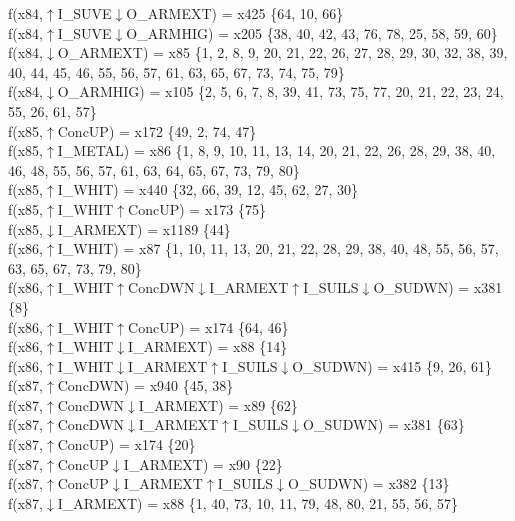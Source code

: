 f(x84,$\uparrow$I\_SUVE$\downarrow$O\_ARMEXT) = x425 \{64, 10, 66\} \\  
f(x84,$\uparrow$I\_SUVE$\downarrow$O\_ARMHIG) = x205 \{38, 40, 42, 43, 76, 78, 25, 58, 59, 60\} \\  
f(x84,$\downarrow$O\_ARMEXT) = x85 \{1, 2, 8, 9, 20, 21, 22, 26, 27, 28, 29, 30, 32, 38, 39, 40, 44, 45, 46, 55, 56, 57, 61, 63, 65, 67, 73, 74, 75, 79\} \\  
f(x84,$\downarrow$O\_ARMHIG) = x105 \{2, 5, 6, 7, 8, 39, 41, 73, 75, 77, 20, 21, 22, 23, 24, 55, 26, 61, 57\} \\  
f(x85,$\uparrow$ConcUP) = x172 \{49, 2, 74, 47\} \\  
f(x85,$\uparrow$I\_METAL) = x86 \{1, 8, 9, 10, 11, 13, 14, 20, 21, 22, 26, 28, 29, 38, 40, 46, 48, 55, 56, 57, 61, 63, 64, 65, 67, 73, 79, 80\} \\  
f(x85,$\uparrow$I\_WHIT) = x440 \{32, 66, 39, 12, 45, 62, 27, 30\} \\  
f(x85,$\uparrow$I\_WHIT$\uparrow$ConcUP) = x173 \{75\} \\  
f(x85,$\downarrow$I\_ARMEXT) = x1189 \{44\} \\  
f(x86,$\uparrow$I\_WHIT) = x87 \{1, 10, 11, 13, 20, 21, 22, 28, 29, 38, 40, 48, 55, 56, 57, 63, 65, 67, 73, 79, 80\} \\  
f(x86,$\uparrow$I\_WHIT$\uparrow$ConcDWN$\downarrow$I\_ARMEXT$\uparrow$I\_SUILS$\downarrow$O\_SUDWN) = x381 \{8\} \\  
f(x86,$\uparrow$I\_WHIT$\uparrow$ConcUP) = x174 \{64, 46\} \\  
f(x86,$\uparrow$I\_WHIT$\downarrow$I\_ARMEXT) = x88 \{14\} \\  
f(x86,$\uparrow$I\_WHIT$\downarrow$I\_ARMEXT$\uparrow$I\_SUILS$\downarrow$O\_SUDWN) = x415 \{9, 26, 61\} \\  
f(x87,$\uparrow$ConcDWN) = x940 \{45, 38\} \\  
f(x87,$\uparrow$ConcDWN$\downarrow$I\_ARMEXT) = x89 \{62\} \\  
f(x87,$\uparrow$ConcDWN$\downarrow$I\_ARMEXT$\uparrow$I\_SUILS$\downarrow$O\_SUDWN) = x381 \{63\} \\  
f(x87,$\uparrow$ConcUP) = x174 \{20\} \\  
f(x87,$\uparrow$ConcUP$\downarrow$I\_ARMEXT) = x90 \{22\} \\  
f(x87,$\uparrow$ConcUP$\downarrow$I\_ARMEXT$\uparrow$I\_SUILS$\downarrow$O\_SUDWN) = x382 \{13\} \\  
f(x87,$\downarrow$I\_ARMEXT) = x88 \{1, 40, 73, 10, 11, 79, 48, 80, 21, 55, 56, 57\} \\  
